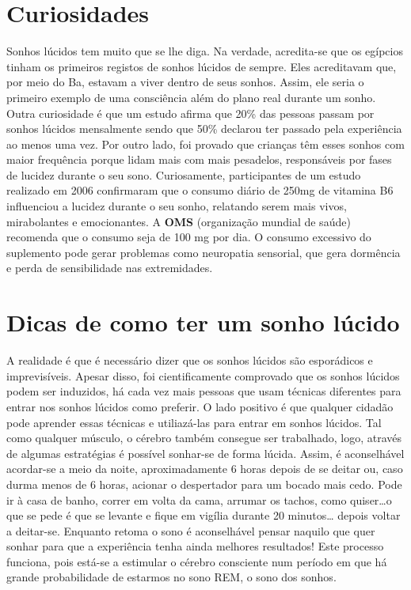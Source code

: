 \documentclass{report}
\begin{document}
\section{Curiosidades}
Sonhos lúcidos tem muito que se lhe diga. Na verdade, acredita-se que os egípcios tinham os primeiros registos de sonhos lúcidos de sempre. Eles acreditavam que, por meio do Ba, estavam a viver dentro de seus sonhos. Assim, ele seria o primeiro exemplo de uma consciência além do plano real durante um sonho.
Outra curiosidade é que um estudo afirma que 20\% das pessoas passam por sonhos lúcidos mensalmente sendo que 50\% declarou ter passado pela experiência ao menos uma vez. Por outro lado, foi provado que crianças têm esses sonhos com maior frequência porque lidam mais com mais pesadelos, responsáveis por fases de lucidez durante o seu sono.
Curiosamente, participantes de um estudo realizado em 2006 confirmaram que o consumo diário de 250mg de vitamina B6 influenciou a lucidez durante o seu sonho, relatando serem mais vivos, mirabolantes e emocionantes. A \textbf{OMS} (organização mundial de saúde) recomenda que o consumo seja de 100 mg por dia. O consumo excessivo do suplemento pode gerar problemas como neuropatia sensorial, que gera dormência e perda de sensibilidade nas extremidades.



\section{Dicas de como ter um sonho lúcido}
A realidade é que é necessário dizer que os sonhos lúcidos são esporádicos e imprevisíveis. Apesar disso, foi cientificamente comprovado que os sonhos lúcidos podem ser induzidos, há cada vez mais pessoas que usam técnicas diferentes para entrar nos sonhos lúcidos como preferir.
O lado positivo é que qualquer cidadão pode aprender essas técnicas e utiliazá-las para entrar em sonhos lúcidos. Tal como qualquer músculo, o cérebro também consegue ser trabalhado, logo, através de algumas estratégias é possível sonhar-se de forma lúcida. Assim, é aconselhável acordar-se a meio da noite, aproximadamente 6 horas depois de se deitar ou, caso durma menos de 6 horas, acionar o despertador para um bocado mais cedo. Pode ir à casa de banho, correr em volta da cama, arrumar os tachos, como quiser…o que se pede é que se levante e fique em vigília durante 20 minutos… depois voltar a deitar-se. Enquanto retoma o sono é aconselhável pensar naquilo que quer sonhar para que a experiência tenha ainda melhores resultados! Este processo funciona, pois está-se a estimular o cérebro consciente num período em que há grande probabilidade de estarmos no sono REM, o sono dos sonhos. 
 
\end{document}

